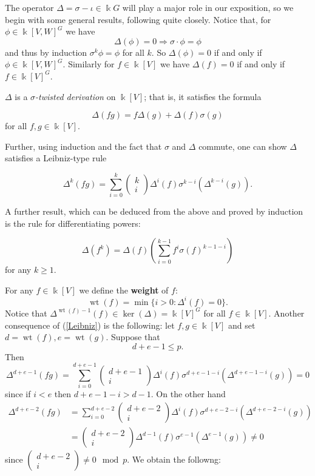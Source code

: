 \documentclass[a4paper]{amsart}
\newcommand{\kk}{\Bbbk}
\def\wt{\operatorname{wt}}
\newtheorem*{Corollary of Conjecture}{Corollary of Conjecture}
\theoremstyle{definition}
\theoremstyle{remark}
\theoremstyle{Acknowledgments}
\begin{document}
The operator $\Delta = \sigma-\iota \in \kk G$ will play a major role in our exposition, so we begin with some general results, following \cite{ElmerCov} quite closely. Notice that, for $\phi \in \kk[V,W]^G$ we have
\[\Delta(\phi) = 0 \Rightarrow \sigma \cdot \phi = \phi\] and thus by induction $\sigma^k \phi = \phi$ for all $k$. So $\Delta(\phi)=0$ if and only if $\phi \in \kk[V,W]^G$. Similarly for $f \in \kk[V]$ we have $\Delta(f)=0$ if and only if $f \in \kk[V]^G$. 

$\Delta$ is a \emph{$\sigma$-twisted derivation} on $\kk[V]$; that is, it satisfies the formula

\begin{equation}\label{derivation} \Delta(fg) = f\Delta(g)+\Delta(f)\sigma(g)\end{equation} for all $f, g \in \kk[V]$.  

Further, using induction and the fact that $\sigma$ and $\Delta$ commute, one can show $\Delta$ satisfies a Leibniz-type rule

\begin{equation}\label{Leibniz}
\Delta^k(fg) = \sum_{i=0}^k \begin{pmatrix} k\\i \end{pmatrix} \Delta^i( f) \sigma^{k-i}( \Delta^{k-i} (g)).
\end{equation}

A further result, which can be deduced from the above and proved by induction is the rule for differentiating powers:

\begin{equation}\label{powerrule}
\Delta(f^k) = \Delta(f)\left( \sum_{i=0}^{k-1} f^i \sigma(f)^{k-1-i} \right)
\end{equation}
for any $k \geq 1$.

For any $f \in \kk[V]$ we define the \textbf{weight} of $f$:
\[\wt(f) = \min\{i>0: \Delta^i(f) = 0\}.\]
Notice that $\Delta^{\wt(f)-1}(f) \in \ker(\Delta) = \kk[V]^G$ for all $f \in \kk[V]$. 
Another consequence of  (\ref{Leibniz}) is the following: let $f, g \in \kk[V]$ and set $d = \wt(f), e = \wt(g)$. Suppose that
\[d+e-1 \leq p.\] Then
\[\Delta^{d+e-1}(fg) = \sum_{i=0}^{d+e-1}\begin{pmatrix} d+e-1\\i \end{pmatrix}\Delta^i(f)\sigma^{d+e-1-i}(\Delta^{d+e-1-i}(g)) = 0\]
since if $i<e$ then $d+e-1-i>d-1$. On the other hand
\begin{align*}
\Delta^{d+e-2}(fg) &= \sum_{i=0}^{d+e-2}\begin{pmatrix} d+e-2\\i \end{pmatrix}\Delta^i(f)\sigma^{d+e-2-i}(\Delta^{d+e-2-i}(g)) \\
 &= \begin{pmatrix} d+e-2\\i \end{pmatrix}\Delta^{d-1}(f)\sigma^{e-1}(\Delta^{e-1}(g)) \neq 0 \end{align*}
since $\begin{pmatrix} d+e-2\\i \end{pmatrix} \neq 0 \mod p$. We obtain the followng:
\end{document}

